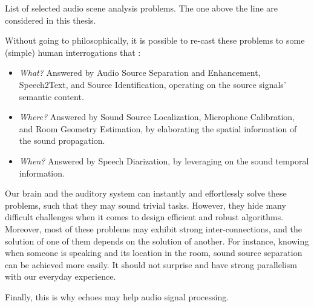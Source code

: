 \begin{table}[!h]

    \begin{fullwidth}
    \centering
    \small

    
    \caption{List of selected audio scene analysis problems. The one above the line are considered in this thesis.}
    \label{tab:processing:problems}

    \end{fullwidth}

\end{table}

\mynewline
Without going to philosophically, it is possible to re-cast these problems to some (simple) human interrogations that :
\begin{itemize}
    \item  \textit{What?} Answered by Audio Source Separation and Enhancement, Speech2Text, and Source Identification, operating on the source signals' semantic content.
    \item  \textit{Where?} Answered by Sound Source Localization, Microphone Calibration, and Room Geometry Estimation, by elaborating the spatial information of the sound propagation.
    \item  \textit{When?} Answered by Speech Diarization, by leveraging on the sound temporal information.
\end{itemize}

\mynewline{}
Our brain and the auditory system can instantly and effortlessly solve these problems, such that they may sound trivial tasks.
However, they hide many difficult challenges when it comes to design efficient and robust algorithms.
Moreover, most of these problems may exhibit strong inter-connections, and the solution of one of them depends on the solution of another.
For instance, knowing when someone is speaking and its location in the room, sound source separation can be achieved more easily.
It should not surprise and have strong parallelism with our everyday experience.

\mynewline
Finally, this is why echoes may help audio signal processing.



